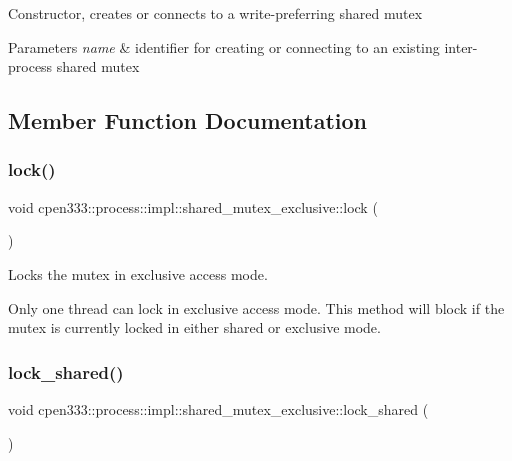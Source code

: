 Constructor, creates or connects to a write-\/preferring shared mutex 
\begin{DoxyParams}{Parameters}
{\em name} & identifier for creating or connecting to an existing inter-\/process shared mutex \\
\hline
\end{DoxyParams}


\subsection{Member Function Documentation}
\mbox{\label{classcpen333_1_1process_1_1impl_1_1shared__mutex__exclusive_a6b6d61dce0f1a536d24e280c4e7ac9a9}} 
\subsubsection{\texorpdfstring{lock()}{lock()}}
{\footnotesize\ttfamily void cpen333\+::process\+::impl\+::shared\+\_\+mutex\+\_\+exclusive\+::lock (\begin{DoxyParamCaption}{ }\end{DoxyParamCaption})\hspace{0.3cm}{\ttfamily [inline]}}



Locks the mutex in exclusive access mode. 

Only one thread can lock in exclusive access mode. This method will block if the mutex is currently locked in either shared or exclusive mode. \mbox{\label{classcpen333_1_1process_1_1impl_1_1shared__mutex__exclusive_ae512adfb383e28ca05d0e1e84f79a898}} 
\subsubsection{\texorpdfstring{lock\+\_\+shared()}{lock\_shared()}}
{\footnotesize\ttfamily void cpen333\+::process\+::impl\+::shared\+\_\+mutex\+\_\+exclusive\+::lock\+\_\+shared (\begin{DoxyParamCaption}{ }\end{DoxyParamCaption})\hspace{0.3cm}{\ttfamily [inline]}}



